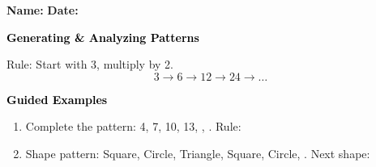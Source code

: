 \documentclass[12pt, letterpaper, fleqn]{article}
\newcommand{\blank}{\underline{\hspace{2.2cm}}}
\newcommand{\blankshorter}{\underline{\hspace{1.5cm}}}
\begin{document}
\textbf{Name:} \underline{\hspace{5cm}}
\hfill
\textbf{Date:} \underline{\hspace{3cm}}\\

\begin{tcolorbox}[colback=customteal!20]
    \large\textcolor{black}{\textbf{Generating & Analyzing Patterns}}
\end{tcolorbox}
\vspace{3mm}
Rule: Start with 3, multiply by 2.
\[
3 \rightarrow 6 \rightarrow 12 \rightarrow 24 \rightarrow \dots
\]
\newpage
\begin{tcolorbox}[colback=customteal!20]
    \large\textcolor{black}{\textbf{Guided Examples}}
\end{tcolorbox}
\begin{enumerate}[itemsep=3.5cm, leftmargin=0.6cm]
\item Complete the pattern: 4, 7, 10, 13, \blank, \blank. Rule: \blankshorter
\item Shape pattern: Square, Circle, Triangle, Square, Circle, \blank. Next shape: \blankshorter
\end{enumerate}
\end{document}
